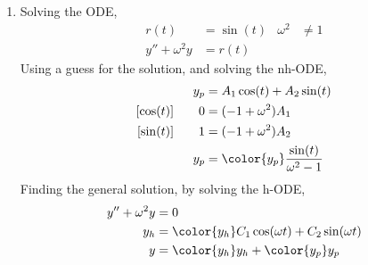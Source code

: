 \begin{enumerate}
    \item Solving the ODE,
          \begin{align}
              r(t)             & = \sin(t) &
              \omega^2         & \neq 1      \\
              y'' + \omega^2 y & = r(t)
          \end{align}
          Using a guess for the solution, and solving the nh-ODE,
          \begin{align}
              y_p                & = A_1 \cos(t) + A_2 \sin(t)                \\
              [\cos(t)]\qquad  0 & = (-1 + \omega^2)A_1                       \\
              [\sin(t)]\qquad  1 & = (-1 + \omega^2)A_2                       \\
              y_p                & = \color{y_p} \frac{\sin(t)}{\omega^2 - 1}
          \end{align}
          Finding the general solution, by solving the h-ODE,
          \begin{align}
              y'' + \omega^2 y & = 0                                                   \\
              y_h              & = \color{y_h} C_1 \cos(\omega t) + C_2 \sin(\omega t) \\
              y                & = {\color{y_h} y_h} + {\color{y_p} y_p}
          \end{align}
          \begin{figure}[H]
              \centering
          \end{figure}


\end{enumerate}
